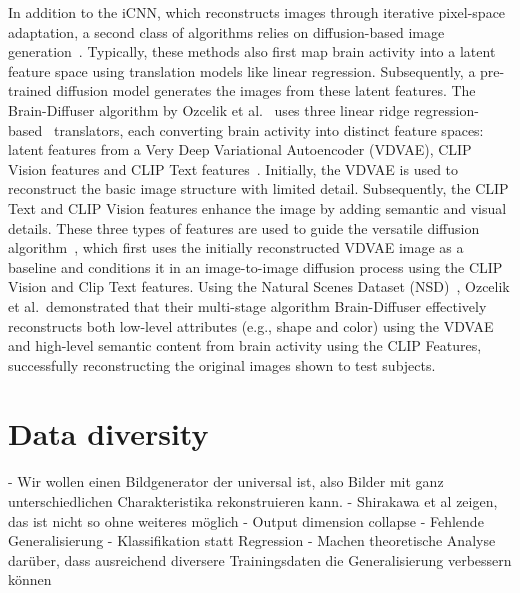 In addition to the iCNN, which reconstructs images through iterative pixel-space adaptation, a second class of algorithms relies on diffusion-based image generation~\cite{takagiHighResolutionImageReconstruction,ozcelikNaturalSceneReconstruction2023,scottiMindEye2SharedSubjectModels2024}. Typically, these methods also first map brain activity into a latent feature space using translation models like linear regression. Subsequently, a pre-trained diffusion model generates the images from these latent features. The Brain-Diffuser algorithm by Ozcelik et al.~\cite{ozcelikNaturalSceneReconstruction2023} uses three linear ridge regression-based~\cite{hoerlRidgeRegressionBiased1970} translators, each converting brain activity into distinct feature spaces: latent features from a Very Deep Variational Autoencoder (VDVAE)\cite{childVeryDeepVAEs2020},  CLIP Vision features and CLIP Text features~\cite{radfordLearningTransferableVisual2021}. Initially, the VDVAE is used to reconstruct the basic image structure with limited detail. Subsequently, the CLIP Text and CLIP Vision features enhance the image by adding semantic and visual details. These three types of features are used to guide the versatile diffusion algorithm~\cite{xuVersatileDiffusionText2024}, which first uses the initially reconstructed VDVAE image as a baseline and conditions it in an image-to-image diffusion process using the CLIP Vision and Clip Text features. Using the Natural Scenes Dataset (NSD)~\cite{allenMassive7TFMRI2022}, Ozcelik et al.\ demonstrated that their multi-stage algorithm Brain-Diffuser effectively reconstructs both low-level attributes (e.g., shape and color) using the VDVAE and high-level semantic content from brain activity using the CLIP Features, successfully reconstructing the original images shown to test subjects.




\section{Data diversity}

- Wir wollen einen Bildgenerator der universal ist, also Bilder mit ganz unterschiedlichen Charakteristika rekonstruieren kann.
    - Shirakawa et al zeigen, das ist nicht so ohne weiteres möglich
        - Output dimension collapse
        - Fehlende Generalisierung
        - Klassifikation statt Regression
        - Machen theoretische Analyse darüber, dass ausreichend diversere Trainingsdaten die Generalisierung verbessern können

